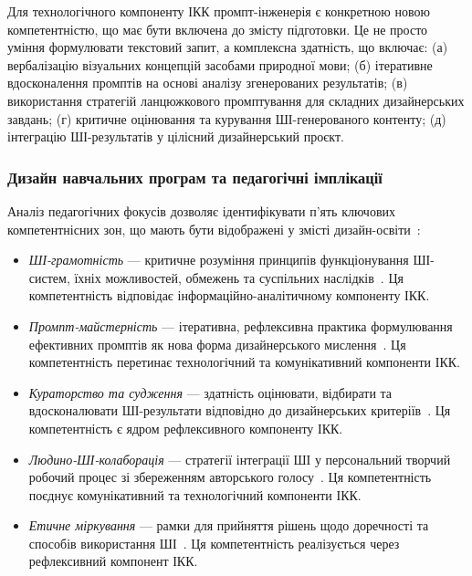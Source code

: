 Для технологічного компоненту ІКК промпт-інженерія є конкретною новою компетентністю, що має бути включена до змісту підготовки. Це не просто уміння формулювати текстовий запит, а комплексна здатність, що включає: (а) вербалізацію візуальних концепцій засобами природної мови; (б) ітеративне вдосконалення промптів на основі аналізу згенерованих результатів; (в) використання стратегій ланцюжкового промптування для складних дизайнерських завдань; (г) критичне оцінювання та курування ШІ-генерованого контенту; (д) інтеграцію ШІ-результатів у цілісний дизайнерський проєкт.

\subsubsection{Дизайн навчальних програм та педагогічні імплікації}\label{sssec:1.2.12}

Аналіз педагогічних фокусів дозволяє ідентифікувати п'ять ключових компетентнісних зон, що мають бути відображені у змісті дизайн-освіти~\cite{Musiienko2026ScopingReview}:

\begin{itemize}
\item \textit{ШІ-грамотність} --- критичне розуміння принципів функціонування ШІ-систем, їхніх можливостей, обмежень та суспільних наслідків~\cite{Pudasaini2025}. Ця компетентність відповідає інформаційно-аналітичному компоненту ІКК.

\item \textit{Промпт-майстерність} --- ітеративна, рефлексивна практика формулювання ефективних промптів як нова форма дизайнерського мислення~\cite{Lee2024}. Ця компетентність перетинає технологічний та комунікативний компоненти ІКК.

\item \textit{Кураторство та судження} --- здатність оцінювати, відбирати та вдосконалювати ШІ-результати відповідно до дизайнерських критеріїв~\cite{MedelVera2025}. Ця компетентність є ядром рефлексивного компоненту ІКК.

\item \textit{Людино-ШІ-колаборація} --- стратегії інтеграції ШІ у персональний творчий робочий процес зі збереженням авторського голосу~\cite{Turchi2023}. Ця компетентність поєднує комунікативний та технологічний компоненти ІКК.

\item \textit{Етичне міркування} --- рамки для прийняття рішень щодо доречності та способів використання ШІ~\cite{Buragohain2025}. Ця компетентність реалізується через рефлексивний компонент ІКК.
\end{itemize}

